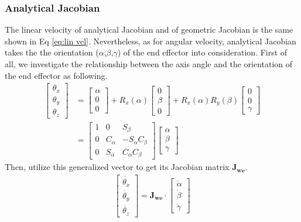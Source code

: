 \subsubsection{Analytical Jacobian}
The linear velocity of analytical Jacobian and of geometric Jacobian is the same shown in Eq \ref{eq:lin vel}. Nevertheless, as for angular velocity, analytical Jacobian takes the the orientation ($\alpha$,$\beta$,$\gamma$) of the end effector into consideration. First of all, we investigate the relationship between the axis angle and the orientation of the end effector as following.
\begin{equation}
\begin{split}
\begin{bmatrix}
\theta _x \\ 
\theta _y \\ 
\theta _z
\end{bmatrix}
&=
\begin{bmatrix}
\alpha \\ 
0\\ 
0
\end{bmatrix}
+
R_x(\alpha)
\begin{bmatrix}
0 \\ 
\beta \\ 
0
\end{bmatrix}
+
R_x(\alpha)R_y(\beta)
\begin{bmatrix}
0 \\ 
0\\ 
\gamma
\end{bmatrix}\\
&=
\begin{bmatrix}
1 & 0 & S_\beta \\ 
0 & C_\alpha & -S_\alpha C_\beta \\ 
0 & S_\alpha & C_\alpha C_\beta
\end{bmatrix}
\begin{bmatrix}
\alpha \\ 
\beta\\ 
\gamma
\end{bmatrix}
\end{split}
\end{equation}
Then, utilize this generalized vector to get its Jacobian matrix $\mathbf{J_{we}}$.
\begin{equation}
\begin{split}
\begin{bmatrix}
\dot{\theta _x} \\ 
\dot{\theta _y} \\ 
\dot{\theta _z}
\end{bmatrix}
=
\mathbf{J_{\!we}}
\cdot
\begin{bmatrix}
\dot{\alpha} \\ 
\dot{\beta} \\ 
\dot{\gamma}
\end{bmatrix}
\end{split}
\end{equation}
